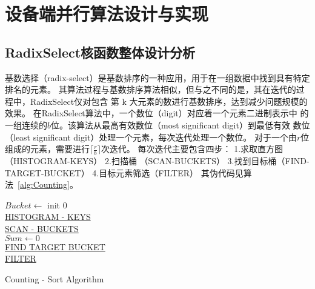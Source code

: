 \section{设备端并行算法设计与实现}

\subsection{RadixSelect核函数整体设计分析}
基数选择（radix-select）是基数排序的一种应用，用于在一组数据中找到具有特定排名的元素。
其算法过程与基数排序算法相似，但与之不同的是，其在迭代的过程中，RadixSelect仅对包含
第 k 大元素的数进行基数排序，达到减少问题规模的效果。
在RadixSelect算法中，一个数位（digit）对应着一个元素二进制表示中
的一组连续的\(b\)位。该算法从最高有效数位（most significant digit）到最低有效
数位（least significant digit）处理一个元素，每次迭代处理一个数位。
对于一个由\(r\)位组成的元素，需要进行\(\lceil\frac{r}{b}\rceil\)次迭代。
每次迭代主要包含四步：
1.求取直方图（HISTOGRAM-KEYS） 
2.扫描桶 （SCAN-BUCKETS） 
3.找到目标桶（FIND-TARGET-BUCKET） 
4.目标元素筛选（FILTER）
其伪代码见算法~\ref{alg:Counting}。

\begin{algorithm}
    \SetAlgoLined
    $Bucket \leftarrow$ init $0$ \\ 
    \underline{HISTOGRAM - KEYS}\\
    \underline{SCAN - BUCKETS}\\
    $Sum \leftarrow 0$\\
    \underline{FIND TARGET BUCKET}\\
    \underline{FILTER}\\
    \caption{Counting - Sort Algorithm}
    \label{alg:Counting}
  \end{algorithm}
  

